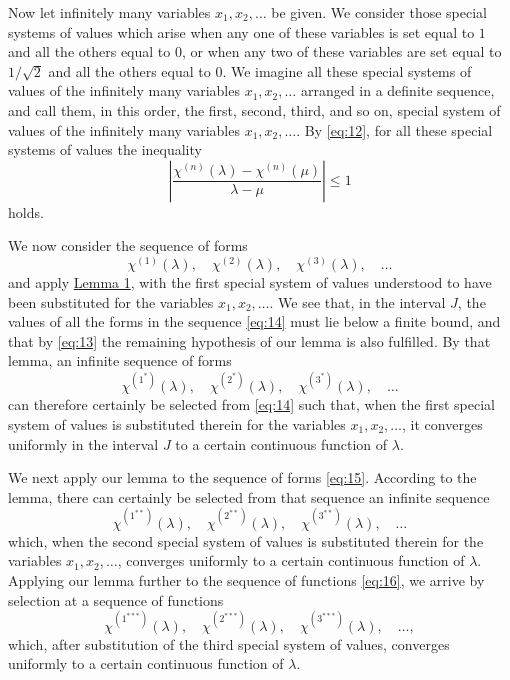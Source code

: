 \documentclass[b5paper,twoside]{article}
\newcommand{\originalpage}[1]{\phantomsection\label{origpage:#1}}
\begin{document}
Now let infinitely many variables $x_1,x_2,\ldots$ be given.  We consider
those special systems of values which arise when any one of these variables
is set equal to $1$ and all the others equal to $0$, or when any two of these
variables are set equal to $1/\sqrt2$ and all the others equal to $0$.  We
imagine all these special systems of values of the infinitely many variables
$x_1,x_2,\ldots$ arranged in a definite sequence, and call them, in this
order, the first, second, third, and so on, special system of values of the
infinitely many variables $x_1,x_2,\ldots$.  By \eqref{eq:12}, for all these
special systems of values the inequality
\begin{equation}
\tag{13}\label{eq:13}
  \left|
  \frac{\chi^{(n)}(\lambda)-\chi^{(n)}(\mu)}{\lambda-\mu}
  \right|\le 1
\end{equation}
holds.

We now consider the sequence of forms
\begin{equation}
\tag{14}\label{eq:14}
  \chi^{(1)}(\lambda),\quad
  \chi^{(2)}(\lambda),\quad
  \chi^{(3)}(\lambda),\quad\ldots
\end{equation}
and apply \hyperref[lem:1]{Lemma 1}, with the first special system of values
understood to have been substituted for the variables $x_1,x_2,\ldots$.
We see that, in the interval $J$, the values of all the forms in the sequence
\eqref{eq:14} must lie below a finite bound, and that by \eqref{eq:13} the
remaining hypothesis of our lemma is also fulfilled.  By that lemma, an
infinite sequence of forms
\begin{equation}
\tag{15}\label{eq:15}
  \chi^{(1^*)}(\lambda),\quad
  \chi^{(2^*)}(\lambda),\quad
  \chi^{(3^*)}(\lambda),\quad\ldots
\end{equation}
can therefore certainly be selected from \eqref{eq:14} such that, when the
first special system of values is substituted therein for the variables
$x_1,x_2,\ldots$, it converges uniformly in the interval $J$ to a certain
continuous function of $\lambda$.

\originalpage{166}
We next apply our lemma to the sequence of forms \eqref{eq:15}.  According to
the lemma, there can certainly be selected from that sequence an infinite
sequence
\begin{equation}
\tag{16}\label{eq:16}
  \chi^{(1^{**})}(\lambda),\quad
  \chi^{(2^{**})}(\lambda),\quad
  \chi^{(3^{**})}(\lambda),\quad\ldots
\end{equation}
which, when the second special system of values is substituted therein for
the variables $x_1,x_2,\ldots$, converges uniformly to a certain continuous
function of $\lambda$.  Applying our lemma further to the sequence of
functions \eqref{eq:16}, we arrive by selection at a sequence of functions
\[
  \chi^{(1^{***})}(\lambda),\quad
  \chi^{(2^{***})}(\lambda),\quad
  \chi^{(3^{***})}(\lambda),\quad\ldots,
\]
which, after substitution of the third special system of values, converges
uniformly to a certain continuous function of $\lambda$.
\end{document}
